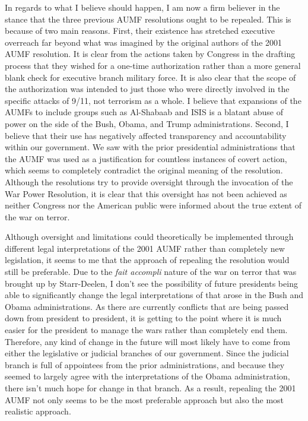 \documentclass[12pt]{article}
\begin{document}
In regards to what I believe should happen, I am now a firm believer in the stance that the three previous AUMF resolutions ought to be repealed.
This is because of two main reasons.
First, their existence has stretched executive overreach far beyond what was imagined by the original authors of the 2001 AUMF resolution.
It is clear from the actions taken by Congress in the drafting process that they wished for a one-time authorization rather than a more general blank check for executive branch military force.
It is also clear that the scope of the authorization was intended to just those who were directly involved in the specific attacks of 9/11, not terrorism as a whole.
I believe that expansions of the AUMFs to include groups such as Al-Shabaab and ISIS is a blatant abuse of power on the side of the Bush, Obama, and Trump administrations.
Second, I believe that their use has negatively affected transparency and accountability within our government.
We saw with the prior presidential administrations that the AUMF was used as a justification for countless instances of covert action, which seems to completely contradict the original meaning of the resolution.
Although the resolutions try to provide oversight through the invocation of the War Power Resolution, it is clear that this oversight has not been achieved as neither Congress nor the American public were informed about the true extent of the war on terror.

Although oversight and limitations could theoretically be implemented through different legal interpretations of the 2001 AUMF rather than completely new legislation, it seems to me that the approach of repealing the resolution would still be preferable.
Due to the \emph{fait accompli} nature of the war on terror that was brought up by Starr-Deelen, I don't see the possibility of future presidents being able to significantly change the legal interpretations of that arose in the Bush and Obama administrations.
As there are currently conflicts that are being passed down from president to president, it is getting to the point where it is much easier for the president to manage the wars rather than completely end them.
Therefore, any kind of change in the future will most likely have to come from either the legislative or judicial branches of our government.
Since the judicial branch is full of appointees from the prior administrations, and because they seemed to largely agree with the interpretations of the Obama administration, there isn't much hope for change in that branch.
As a result, repealing the 2001 AUMF not only seems to be the most preferable approach but also the most realistic approach.
\end{document}
